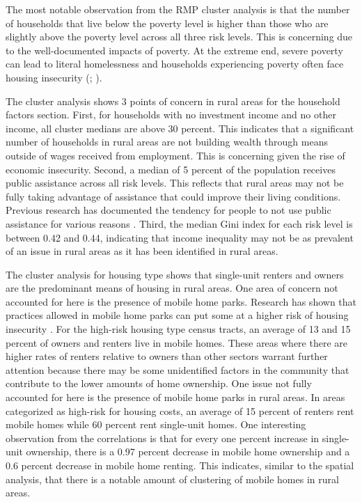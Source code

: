 The most notable observation from the RMP cluster analysis is that the number of households that live below the poverty level is higher than those who are slightly above the poverty level across all three risk levels. This is concerning due to the well-documented impacts of poverty. At the extreme end, severe poverty can lead to literal homelessness and households experiencing poverty often face housing insecurity (\citealp{evans_reducing_2019}; \citealp{cox_road_2019}). 
 
 The cluster analysis shows 3 points of concern in rural areas for the household factors section. First, for households with no investment income and no other income, all cluster medians are above 30 percent. This indicates that a significant number of households in rural areas are not building wealth through means outside of wages received from employment. This is concerning given the rise of economic insecurity. Second, a median of 5 percent of the population receives public assistance across all risk levels. This reflects that rural areas may not be fully taking advantage of assistance that could improve their living conditions. Previous research has documented the tendency for people to not use public assistance for various reasons \citep{lichter_changing_2007}. Third, the median Gini index for each risk level is between 0.42 and 0.44, indicating that income inequality may not be as prevalent of an issue in rural areas as it has been identified in rural areas.

The cluster analysis for housing type shows that single-unit renters and owners are the predominant means of housing in rural areas. One area of concern not accounted for here is the presence of mobile home parks. Research has shown that practices allowed in mobile home parks can put some at a higher risk of housing insecurity \citep{mactavish_policy_2006}. For the high-risk housing type census tracts, an average of 13 and 15 percent of owners and renters live in mobile homes. These areas where there are higher rates of renters relative to owners than other sectors warrant further attention because there may be some unidentified factors in the community that contribute to the lower amounts of home ownership. One issue not fully accounted for here is the presence of mobile home parks in rural areas. In areas categorized as high-risk for housing costs, an average of 15 percent of renters rent mobile homes while 60 percent rent single-unit homes. One interesting observation from the correlations is that for every one percent increase in single-unit ownership, there is a 0.97 percent decrease in mobile home ownership and a 0.6 percent decrease in mobile home renting. This indicates, similar to the spatial analysis, that there is a notable amount of clustering of mobile homes in rural areas.  



